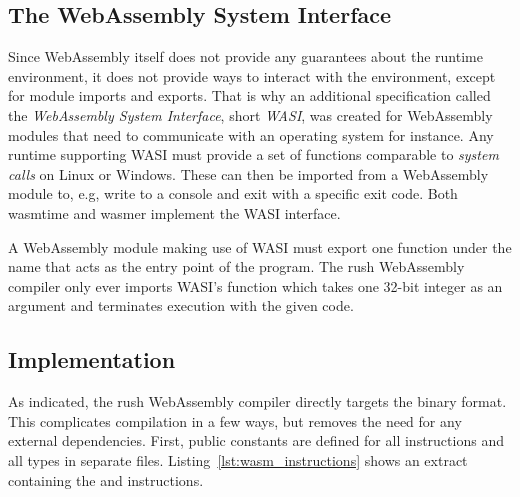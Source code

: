 \subsection{The WebAssembly System Interface}

Since WebAssembly itself does not provide any guarantees about the runtime environment, it does not provide ways to interact with the environment, except for module imports and exports.
That is why an additional specification called the \emph{WebAssembly System Interface}, short \emph{WASI}, was created for WebAssembly modules that need to communicate with an operating system for instance.
Any runtime supporting WASI must provide a set of functions comparable to \emph{system calls} on Linux or Windows.
These can then be imported from a WebAssembly module to, e.g, write to a console and exit with a specific exit code.
Both wasmtime and wasmer implement the WASI interface.

A WebAssembly module making use of WASI must export one function under the name  that acts as the entry point of the program.
The rush WebAssembly compiler only ever imports WASI's  function which takes one 32-bit integer as an argument and terminates execution with the given code.

\subsection{Implementation}


As indicated, the rush WebAssembly compiler directly targets the binary format.
This complicates compilation in a few ways, but removes the need for any external dependencies.
First, public constants are defined for all instructions and all types in separate files.
Listing~\ref{lst:wasm_instructions} shows an extract containing the  and  instructions.

